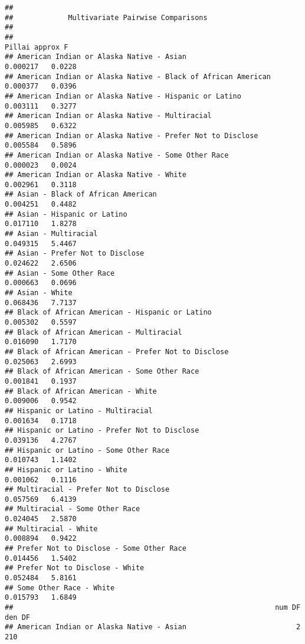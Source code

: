 \documentclass[
]{article}
\begin{document}
\begin{verbatim}
## 
##             Multivariate Pairwise Comparisons
## 
##                                                                Pillai approx F
## American Indian or Alaska Native - Asian                     0.000217   0.0228
## American Indian or Alaska Native - Black of African American 0.000377   0.0396
## American Indian or Alaska Native - Hispanic or Latino        0.003111   0.3277
## American Indian or Alaska Native - Multiracial               0.005985   0.6322
## American Indian or Alaska Native - Prefer Not to Disclose    0.005584   0.5896
## American Indian or Alaska Native - Some Other Race           0.000023   0.0024
## American Indian or Alaska Native - White                     0.002961   0.3118
## Asian - Black of African American                            0.004251   0.4482
## Asian - Hispanic or Latino                                   0.017110   1.8278
## Asian - Multiracial                                          0.049315   5.4467
## Asian - Prefer Not to Disclose                               0.024622   2.6506
## Asian - Some Other Race                                      0.000663   0.0696
## Asian - White                                                0.068436   7.7137
## Black of African American - Hispanic or Latino               0.005302   0.5597
## Black of African American - Multiracial                      0.016090   1.7170
## Black of African American - Prefer Not to Disclose           0.025063   2.6993
## Black of African American - Some Other Race                  0.001841   0.1937
## Black of African American - White                            0.009006   0.9542
## Hispanic or Latino - Multiracial                             0.001634   0.1718
## Hispanic or Latino - Prefer Not to Disclose                  0.039136   4.2767
## Hispanic or Latino - Some Other Race                         0.010743   1.1402
## Hispanic or Latino - White                                   0.001062   0.1116
## Multiracial - Prefer Not to Disclose                         0.057569   6.4139
## Multiracial - Some Other Race                                0.024045   2.5870
## Multiracial - White                                          0.008894   0.9422
## Prefer Not to Disclose - Some Other Race                     0.014456   1.5402
## Prefer Not to Disclose - White                               0.052484   5.8161
## Some Other Race - White                                      0.015793   1.6849
##                                                              num DF den DF
## American Indian or Alaska Native - Asian                          2    210

\end{verbatim}
\end{document}
